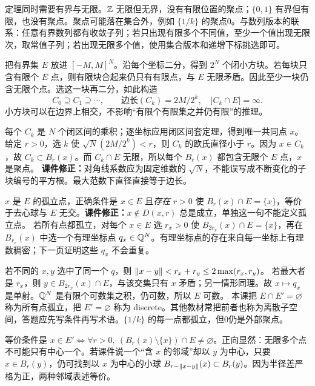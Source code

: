 定理同时需要有界与无限。$\mathbb{Z}$ 无限但无界，没有有限位置的聚点；$\{0,1\}$ 有界但有限，也没有聚点。聚点可能落在集合外，例如 $\{1/k\}$ 的聚点0。与数列版本的联系：任意有界数列都有收敛子列；若只出现有限多个不同值，至少一个值出现无限次，取常值子列；若出现无限多个值，使用集合版本和递增下标挑选即可。

把有界集 $E$ 放进 $[-M,M]^N$。沿每个坐标二分，得到 $2^N$ 个闭小方块。若每块只含有限个 $E$ 点，则有限块合起来仍只有有限点，与 $E$ 无限矛盾。因此至少一块仍含无限个点。选这一块再二分，如此构造
\[
 C_0\supseteq C_1\supseteq\cdots,\qquad
 \text{边长}(C_k)=2M/2^k,\quad |C_k\cap E|=\infty.
\]
小方块可以在边界上相交，不影响``有限个有限集之并仍有限''的推理。

每个 $C_k$ 是 $N$ 个闭区间的乘积；逐坐标应用闭区间套定理，得到唯一共同点 $x$。给定 $r>0$，选 $k$ 使 $\sqrt N(2M/2^k)<r$，则 $C_k$ 的欧氏直径小于 $r$。因为 $x\in C_k$，故 $C_k\subset B_r(x)$。而 $C_k\cap E$ 无限，所以每个 $B_r(x)$ 都包含无限个 $E$ 点，$x$ 是聚点。
\textbf{课件修正：}对角线系数应为固定维数的 $\sqrt N$，不能误写成不断变化的子块编号的平方根。最大范数下直径直接等于边长。

$x$ 是 $E$ 的孤立点，正确条件是 $x\in E$ 且\emph{存在} $r>0$ 使 $B_r(x)\cap E=\{x\}$，等价于去心球与 $E$ 无交。\textbf{课件修正：}$x\notin D(x,r)$ 总是成立，单独这一句不能定义孤立点。
若所有点都孤立，对每个 $x\in E$ 选 $r_x>0$ 使 $B_{2r_x}(x)\cap E=\{x\}$，再在 $B_{r_x}(x)$ 中选一个有理坐标点 $q_x\in\mathbb{Q}^N$。有理坐标点的存在来自每一坐标上有理数稠密；下一页证明这些 $q_x$ 不会重复。

若不同的 $x,y$ 选中了同一个 $q$，则
$\left\lVert x-y\right\rVert<r_x+r_y\le2\max(r_x,r_y)$。
若最大者是 $r_x$，则 $y\in B_{2r_x}(x)\cap E$，与该交集只有 $x$ 矛盾；另一情形同理。故 $x\mapsto q_x$ 是单射。$\mathbb{Q}^N$ 是有限个可数集之积，仍可数，所以 $E$ 可数。
本课把 $E\cap E'=\varnothing$ 称为所有点孤立，把 $E'=\varnothing$ 称为 discrete。其他教材常把前者也称为离散子空间，答题应先写条件再写术语。$\{1/k\}$ 的每一点都孤立，但0仍是外部聚点。

等价条件是 $x\in E'\iff\forall r>0,\ (B_r(x)\setminus\{x\})\cap E\ne\varnothing$。正向显然：无限多个点不可能只有中心一个。若课件说一个``含 $x$ 的邻域''却以 $y$ 为中心，只要 $x\in B_r(y)$，仍可找到以 $x$ 为中心的小球 $B_{r-\left\lVert x-y\right\rVert}(x)\subset B_r(y)$。因为半径差严格为正，两种邻域表述等价。

